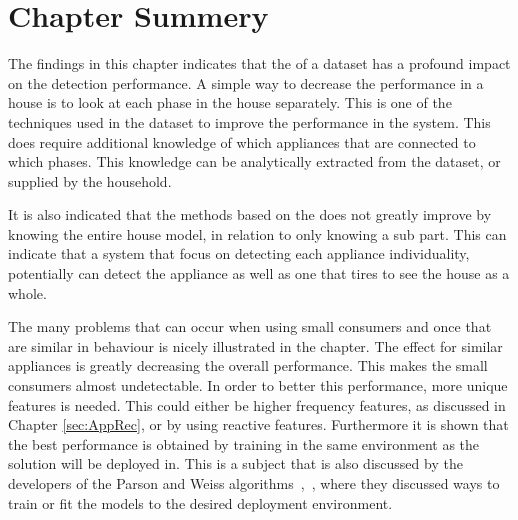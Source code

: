 \section{Chapter Summery}
The findings in this chapter indicates that the  of a dataset has a profound impact on the detection performance. A simple way to decrease the performance in a house is to look at each phase in the house separately. This is one of the techniques used in the  dataset to improve the performance in the system. This does require additional knowledge of which appliances that are connected to which phases. This knowledge can be analytically extracted from the dataset, or supplied by the household. 

It is also indicated that the methods based on the  does not greatly improve by knowing the entire house model, in relation to only knowing a sub part. This can indicate that a system that focus on detecting each appliance individuality, potentially can detect the appliance as well as one that tires to see the house as a whole.   

The many problems that can occur when using small consumers and once that are similar in behaviour is nicely illustrated in the chapter. The  effect for similar appliances is greatly decreasing the overall performance. This makes the small consumers almost undetectable. In order to better this performance, more unique features is needed. This could either be higher frequency features, as discussed in Chapter \ref{sec:AppRec}, or by using reactive features. Furthermore it is shown that the best performance is obtained by training in the same environment as the solution will be deployed in. This is a subject that is also discussed by the developers of the Parson and Weiss algorithms~\citep{RefWorks:28},~\citep{RefWorks:23}, where they discussed ways to train or fit the models to the desired deployment environment.  